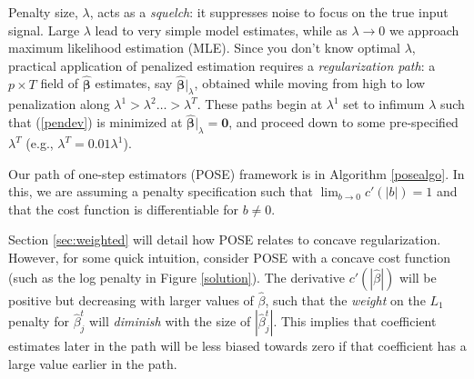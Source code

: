 \documentclass[twoside]{article}
\DeclareMathOperator*{\argmin}{argmin}
\newcommand{\bs}[1]{\boldsymbol{#1}}
\newcommand{\bm}[1]{\mathbf{#1}}
\newcommand{\ds}[1]{\mathds{#1}}
\begin{document}
Penalty size, $\lambda$, acts as a {\it squelch}: it suppresses noise to
focus on the true input signal. Large $\lambda$ lead to very simple 
model estimates, while as $\lambda \rightarrow 0$ we approach maximum
likelihood estimation (MLE). Since you don't know optimal $\lambda$,
practical application of penalized estimation requires a {\it regularization
path}: a $p \times T$ field of $\bs{\hat\beta}$ estimates, say $\bs{\hat\beta}\vert_{\lambda}$, obtained while
moving from high to low penalization along $\lambda^1 > \lambda^2 \ldots >
\lambda^T$.  These paths begin at $\lambda^1$ set to infimum $\lambda$ such that
(\ref{pendev}) is minimized at $\bs{\hat\beta}\vert_{\lambda} = \bm{0}$, and proceed down to some pre-specified $\lambda^T$ (e.g., $\lambda^T=
0.01\lambda^1$).

Our path of one-step estimators (POSE) framework is in  Algorithm \ref{posealgo}.   In this, we are assuming a penalty specification such that $\lim_{b\to 0} c'(|b|) = 1$ and that the cost function is differentiable for $b\neq 0$.  

{
}

Section \ref{sec:weighted} will detail how POSE relates to concave regularization.  However, for some quick intuition, consider POSE with a concave cost function (such as the log penalty in Figure \ref{solution}).
The derivative $c'(|\hat\beta|)$ will be positive but decreasing with larger values of  $\hat\beta$, such that the \textit{weight} on the $L_1$ penalty for $\hat\beta_j^{t}$ will \textit{diminish} with the size of $|\hat\beta_j^{t}|$.  This implies that coefficient estimates later in the path will be less biased towards zero if that coefficient has a large value earlier in the path.
\end{document}
